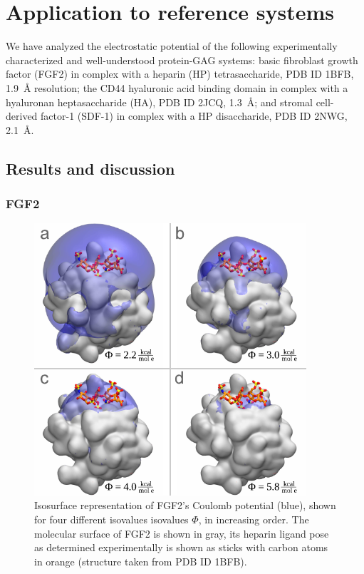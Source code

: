 \section{Application to reference systems}
\label{bspred:application}

We have analyzed the electrostatic potential of the following experimentally
characterized and well-understood protein-GAG systems: basic fibroblast growth
factor (FGF2) in complex with a heparin (HP) tetrasaccharide, PDB ID 1BFB,
\SI{1.9}{\angstrom} resolution; the CD44 hyaluronic acid binding domain in
complex with a hyaluronan heptasaccharide (HA), PDB ID 2JCQ,
\SI{1.3}{\angstrom}; and stromal cell-derived factor-1 (SDF-1) in complex with a
HP disaccharide, PDB ID 2NWG, \SI{2.1}{\angstrom}.



\subsection{Results and discussion}
\label{bspred:appl_discussion}

\subsubsection{FGF2}

\begin{figure}
\centering
\includegraphics[width=0.9\textwidth]{gfx/bspred/fgf2_coulomb_isosurfaces_different_values_03_ds.pdf}
\caption[]{
Isosurface representation of FGF2's Coulomb potential (blue), shown for four
different isovalues isovalues $\Phi$, in increasing order. The molecular surface
of FGF2 is shown in gray, its heparin ligand pose as determined experimentally
is shown as sticks with carbon atoms in orange (structure taken from PDB ID
1BFB).}
\label{fig:bspred:fgf2_multi_iso}
\end{figure}

